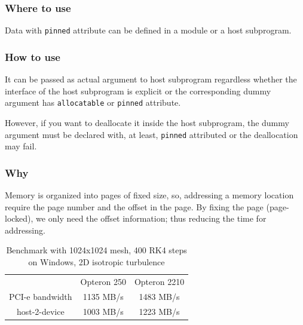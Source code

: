 \subsubsection{Where to use}
\label{sec:where-use}

Data with \verb!pinned! attribute can be defined in a module or a host
subprogram.


\subsubsection{How to use}
\label{sec:how-use}

It can be passed as actual argument to host subprogram regardless
whether the interface of the host subprogram is explicit or the
corresponding dummy argument has \verb!allocatable! or \verb!pinned!
attribute. 

However, if you want to deallocate it inside the host subprogram, the
dummy argument must be declared with, at least, \verb!pinned!
attributed or the deallocation may fail.

\subsubsection{Why}
\label{sec:why}

Memory is organized into pages of fixed size, so, addressing a memory
location require the page number and the offset in the page. By fixing
the page (page-locked), we only need the offset information; thus
reducing the time for addressing. 

\begin{table}[hbt]
  \begin{center}
    \caption{Benchmark with 1024x1024 mesh, 400 RK4 steps on Windows, 2D
      isotropic turbulence }
    \begin{tabular}{ccc} 
      \hline
      & Opteron 250 & Opteron 2210 \\ 
      PCI-e bandwidth & 1135 MB/s & 1483 MB/s \\
      host-2-device & 1003 MB/s & 1223 MB/s \\
      \hline\hline
    \end{tabular}
  \end{center}
  \label{tab:pinneddata}
\end{table}

